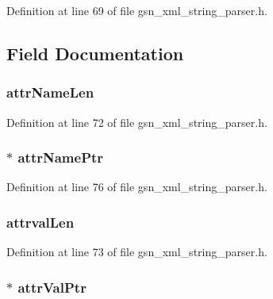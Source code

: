 Definition at line 69 of file gsn\_\-xml\_\-string\_\-parser.h.



\subsection{Field Documentation}
\hypertarget{a00443_a4be0f80f4151640ff25949422d00ab62}{
\subsubsection[{attrNameLen}]{ {\bf attrNameLen}}}
\label{a00443_a4be0f80f4151640ff25949422d00ab62}


Definition at line 72 of file gsn\_\-xml\_\-string\_\-parser.h.

\hypertarget{a00443_a110a752cd801c8e85115da8d85f639bb}{
\subsubsection[{attrNamePtr}]{$\ast$ {\bf attrNamePtr}}}
\label{a00443_a110a752cd801c8e85115da8d85f639bb}


Definition at line 76 of file gsn\_\-xml\_\-string\_\-parser.h.

\hypertarget{a00443_a863da8b68aa7398a50a156f7e53d0969}{
\subsubsection[{attrvalLen}]{ {\bf attrvalLen}}}
\label{a00443_a863da8b68aa7398a50a156f7e53d0969}


Definition at line 73 of file gsn\_\-xml\_\-string\_\-parser.h.

\hypertarget{a00443_ad611971731c2ace7618b87b6114c3e5a}{
\subsubsection[{attrValPtr}]{$\ast$ {\bf attrValPtr}}}
\label{a00443_ad611971731c2ace7618b87b6114c3e5a}


